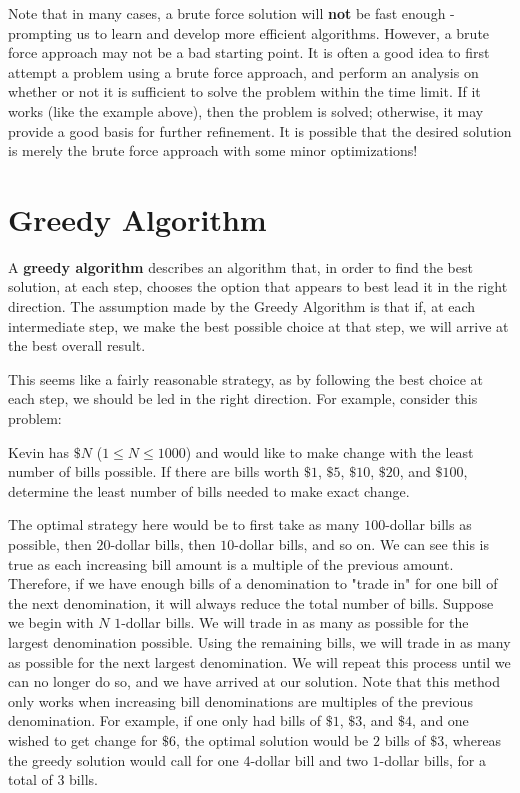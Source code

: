 Note that in many cases, a brute force solution will \textbf{not} be fast enough - prompting us to learn and develop more efficient algorithms.  However, a brute force approach may not be a bad starting point.  It is often a good idea to first attempt a problem using a brute force approach, and perform an analysis on whether or not it is sufficient to solve the problem within the time limit.  If it works (like the example above), then the problem is solved; otherwise, it may provide a good basis for further refinement.  It is possible that the desired solution is merely the brute force approach with some minor optimizations!

\section{Greedy Algorithm} \label{greedy}

A \textbf{greedy algorithm} describes an algorithm that, in order to find the best solution, at each step, chooses the option that appears to best lead it in the right direction.  The assumption made by the Greedy Algorithm is that if, at each intermediate step, we make the best possible choice at that step, we will arrive at the best overall result.

This seems like a fairly reasonable strategy, as by following the best choice at each step, we should be led in the right direction.  For example, consider this problem:

\begin{Problem}
Kevin has $ \$N $ ($ 1 \leq N \leq 1000 $) and would like to make change with the least number of bills possible.  If there are bills worth $ \$1 $, $ \$5 $, $ \$10 $, $ \$20 $, and $ \$100 $, determine the least number of bills needed to make exact change.
\end{Problem}

The optimal strategy here would be to first take as many $ 100 $-dollar bills as possible, then $ 20 $-dollar bills, then $ 10 $-dollar bills, and so on.  We can see this is true as each increasing bill amount is a multiple of the previous amount.  Therefore, if we have enough bills of a denomination to "trade in" for one bill of the next denomination, it will always reduce the total number of bills.  Suppose we begin with $ N $ $ 1 $-dollar bills.  We will trade in as many as possible for the largest denomination possible.  Using the remaining bills, we will trade in as many as possible for the next largest denomination.  We will repeat this process until we can no longer do so, and we have arrived at our solution.  Note that this method only works when increasing bill denominations are multiples of the previous denomination.  For example, if one only had bills of $ \$1 $, $ \$3 $, and $ \$ 4 $, and one wished to get change for $ \$6 $, the optimal solution would be $ 2 $ bills of $ \$3 $, whereas the greedy solution would call for one $ 4 $-dollar bill and two $ 1 $-dollar bills, for a total of $ 3 $ bills.

